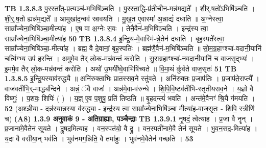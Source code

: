 \documentclass[17pt]{extarticle}
\begin{document}
                  \newline
                                \textbf{ TB 1.3.8.3} \newline
                  पु॒रस्ता᳚त्-प्र॒त्यञ्च॑-म॒भिषि॑ञ्चति । पु॒रस्ता॒द्धि-प्र॑ती॒चीन॒-मन्न॑म॒द्यते᳚ । शी॒र्॒.ष॒तो॑ऽभिषि॑ञ्चति । शी॒र्॒.ष॒तो ह्यन्न॑म॒द्यते᳚ ॥ आमुखा॑द॒न्वव॑ स्रावयति । मु॒ख॒त ए॒वास्मा॑ अ॒न्नाद्यं॑ दधाति ॥ अ॒ग्नेस्त्वा॒ साम्रा᳚ज्येना॒भिषि॑ञ्चा॒मीत्या॑ह । ए॒ष वा अ॒ग्नेः स॒वः । तेनै॒वैन॑-म॒भिषि॑ञ्चति । इन्द्र॑स्य त्वा॒ साम्रा᳚ज्येना॒भिषि॑ञ्चा॒मीत्या॑ह \textbf{ 50} \newline
                  \newline
                                \textbf{ TB 1.3.8.4} \newline
                  इ॒न्द्रि॒य-मे॒वास्मि॑-न्ने॒तेन॑ दधाति । बृह॒स्पते᳚स्त्वा॒ साम्रा᳚ज्येना॒भिषि॑ञ्चा॒-मीत्या॑ह । ब्रह्म॒ वै दे॒वानां॒ बृह॒स्पतिः॑ । ब्रह्म॑णै॒वैन॑-म॒भिषि॑ञ्चति ॥ सो॒म॒ग्र॒हाꣳश्चा॑-वदानी॒यानि॑ च॒र्त्विग्भ्य॒ उप॑ हरन्ति । अ॒मुमे॒व तैर् लो॒क-मन्न॑वन्तं करोति । सु॒रा॒ग्र॒हाꣳश्चा॑-नवदानी॒यानि॑ च वाज॒सृद्भ्यः॑ । इ॒ममे॒व तैर् लो॒क-मन्न॑वन्तं करोति । अथो॑ उ॒भयी᳚ष्वे॒वाभिषि॑च्यते ॥ वि॒मा॒थं कु॑र्वते वाज॒सृतः॑ \textbf{ 51} \newline
                  \newline
                                \textbf{ TB 1.3.8.5} \newline
                  इ॒न्द्रि॒यस्याव॑रुद्ध्यै ॥ अनि॑रुक्ताभिः प्रातस्सव॒ने स्तु॑वते । अनि॑रुक्तः प्र॒जाप॑तिः । प्र॒जाप॑ते॒राप्त्यै᳚ । वाज॑वतीभि॒र्-माद्ध्य॑न्दिने । अन्नं॒ ॅवै वाजः॑ । अन्न॑मे॒वा-व॑रुन्धे । शि॒पि॒वि॒ष्टव॑तीभि-स्तृतीयसव॒ने । य॒ज्ञो वै विष्णुः॑ । प॒शवः॒ शिपिः॑ ( ) । य॒ज्ञ् ए॒व प॒शुषु॒ प्रति॑ तिष्ठति ॥ बृ॒हदन्त्यं॑ भवति । अन्त॑मे॒वैनꣳ॑ श्रि॒यै ग॑मयति । \textbf{ 52} \newline
                  \newline
                                    (अ॒श्ञी॒या - दन्न॑स्यान्न॒स्या व॑रुद्ध्या॒ - इन्द्र॑स्य त्वा॒ साम्रा᳚ज्येना॒भिषि॑ञ्चा॒ मीत्या॑ह-वाज॒सृतः॒ - शिपि॒ स्त्रीणि॑ च) \textbf{(A8)} \newline \newline
                \textbf{ 1.3.9      अनुवाकं   9 - अतिग्राह्याः, पञ्चैन्द्राः} \newline
                                \textbf{ TB 1.3.9.1} \newline
                  नृ॒षदं॒ त्वेत्या॑ह । प्र॒जा वै नॄन् । प्र॒जाना॑मे॒वैतेन॑ सूयते । द्रु॒षद॒मित्या॑ह । वन॒स्पत॑यो॒ वै द्रु । वन॒स्पती॑नामे॒वै तेन॑ सूयते । भु॒व॒न॒सद॒-मित्या॑ह । य॒दा वै वसी॑या॒न् भव॑ति । भुव॑नमग॒न्निति॒ वै तमा॑हुः । भुव॑नमे॒वैतेन॑ गच्छति । \textbf{ 53} \newline
\end{document}
